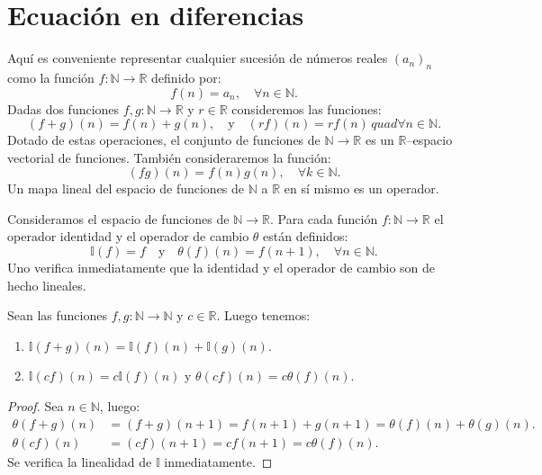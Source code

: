 \section{Ecuación en diferencias}\label{sec:difference}

Aquí es conveniente representar cualquier sucesión de números reales $(a_{n})_{n} $ como la función $f\colon\mathds{N}\rightarrow\mathds{R}$ definido por: \[ f(n)=a_{n},\quad\forall n\in\mathds{N}. \] Dadas dos funciones $f,g\colon\mathds{N}\rightarrow\mathds{R}$ y $r\in\mathds{R} $ consideremos las funciones: \[ (f+g)(n)=f(n)+g(n),\quad\text{y}\quad(rf)(n)=rf(n)\,quad\forall n\in\mathds{N}. \] Dotado de estas operaciones, el conjunto de funciones de $\mathds{N}\rightarrow\mathds{R}$ es un $\mathds{R}$--espacio vectorial de funciones. También consideraremos la función: \[ (fg)(n)=f(n)g(n),\quad\forall k\in\mathbb{N}. \] Un mapa lineal del espacio de funciones de $\mathds{N}$ a $ \mathds{R}$ en sí mismo es un operador.

\begin{definition}
Consideramos el espacio de funciones de $\mathds{N}\to\mathds{R}$. Para cada función $f\colon\mathds{N}\rightarrow\mathds{R}$ el operador identidad y el operador de cambio $\theta$ están definidos: \[ \mathds{I}(f)=f\quad\text{y}\quad\theta(f)(n)=f(n+1),\quad\forall n\in\mathds{N}. \] Uno verifica inmediatamente que la identidad y el operador de cambio son de hecho lineales.
\end{definition}

\begin{proposition}
Sean las funciones $f,g\colon\mathds{N}\to\mathds{N}$ y $c\in\mathds{R}$. Luego tenemos:
\begin{enumerate}
	\item $\mathds{I}\left(f+g\right)(n)=\mathds{I}(f)(n)+\mathds{I}(g)(n)$.
	\item $\mathds{I}\left(cf\right)(n)=c\mathds{I}(f)(n)$ y $\theta\left(cf\right)(n)=c\theta(f)(n)$.
\end{enumerate}
\end{proposition}

\begin{proof}
	Sea $n\in\mathds{N}$, luego:
	\begin{align*}
	\theta(f+g)(n)&=(f+g)(n+1)=f(n+1)+g(n+1)=\theta(f)(n)+\theta(g)(n).\\
	\theta(cf)(n)&=(cf)(n+1)=cf(n+1)=c\theta(f)(n).
	\end{align*}
	Se verifica la linealidad de $\mathds{I}$ inmediatamente.
\end{proof}

